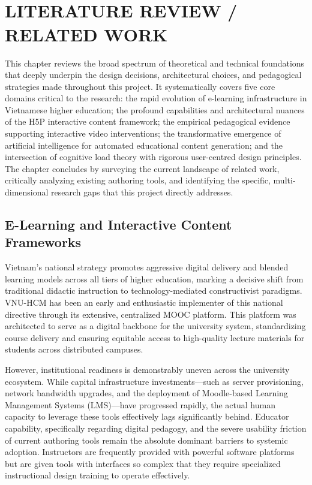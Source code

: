 
\chapter{\\LITERATURE REVIEW / RELATED WORK}

This chapter reviews the broad spectrum of theoretical and technical foundations that deeply underpin the design decisions, architectural choices, and pedagogical strategies made throughout this project. It systematically covers five core domains critical to the research: the rapid evolution of e-learning infrastructure in Vietnamese higher education; the profound capabilities and architectural nuances of the H5P interactive content framework; the empirical pedagogical evidence supporting interactive video interventions; the transformative emergence of artificial intelligence for automated educational content generation; and the intersection of cognitive load theory with rigorous user-centred design principles. The chapter concludes by surveying the current landscape of related work, critically analyzing existing authoring tools, and identifying the specific, multi-dimensional research gaps that this project directly addresses.

\section{E-Learning and Interactive Content Frameworks}

Vietnam's national strategy promotes aggressive digital delivery and blended learning models across all tiers of higher education, marking a decisive shift from traditional didactic instruction to technology-mediated constructivist paradigms. VNU-HCM has been an early and enthusiastic implementer of this national directive through its extensive, centralized MOOC platform. This platform was architected to serve as a digital backbone for the university system, standardizing course delivery and ensuring equitable access to high-quality lecture materials for students across distributed campuses.

However, institutional readiness is demonstrably uneven across the university ecosystem. While capital infrastructure investments—such as server provisioning, network bandwidth upgrades, and the deployment of Moodle-based Learning Management Systems (LMS)—have progressed rapidly, the actual human capacity to leverage these tools effectively lags significantly behind. Educator capability, specifically regarding digital pedagogy, and the severe usability friction of current authoring tools remain the absolute dominant barriers to systemic adoption. Instructors are frequently provided with powerful software platforms but are given tools with interfaces so complex that they require specialized instructional design training to operate effectively.

